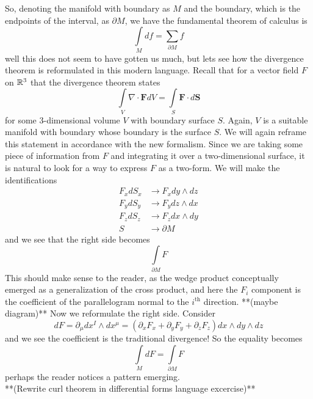 So, denoting the manifold with boundary as $M$ and the boundary, which is the endpoints of the interval, as $\partial M$, we have the fundamental theorem of calculus is
\begin{equation*}
	\int\limits_M df = \sum_{\partial M} f
\end{equation*}
well this does not seem to have gotten us much, but lets see how the divergence theorem is reformulated in this modern language.  Recall that for a vector field $F$ on $\mathbb{R}^3$ that the divergence theorem states
\begin{equation*}
	\int\limits_V \nabla \cdot \mathbf F dV = \int\limits_S \mathbf  F \cdot d\mathbf S
\end{equation*}
for some 3-dimensional volume $V$ with boundary surface $S$.  Again, $V$ is a suitable manifold with boundary whose boundary is the surface $S$.  We will again reframe this statement in accordance with the new formalism.  Since we are taking some piece of information from $F$ and integrating it over a two-dimensional surface, it is natural to look for a way to express $F$ as a two-form.  We will make the identifications
\begin{align*}
	F_x dS_x&\to F_x dy\wedge dz\\
	F_y dS_y&\to F_y dz\wedge dx\\
	F_z dS_z&\to F_z dx\wedge dy\\
	S &\to \partial M
\end{align*}
and we see that the right side becomes 
\begin{equation*}
	\int\limits_{\partial M} F
\end{equation*}
This should make sense to the reader, as the wedge product conceptually emerged as a generalization of the cross product, and here the $F_i$ component is the coefficient of the parallelogram normal to the $i^{\text{th}}$ direction. **(maybe diagram)** 
Now we reformulate the right side.  Consider
\begin{equation*}
	dF = \partial_\mu dx^I\wedge dx^\mu = (\partial_x F_x+\partial_y F_y+\partial_z F_z )dx\wedge dy\wedge dz
\end{equation*}
and we see the coefficient is the traditional divergence!  So the equality becomes 
\begin{equation*}
	\int\limits_M dF = \int\limits_{\partial M} F
\end{equation*} 
perhaps the reader notices a pattern emerging.  \\

**(Rewrite curl theorem in differential forms language excercise)**\\


